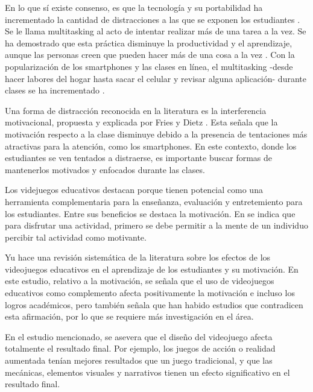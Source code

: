 En lo que sí existe consenso, es que la tecnología y su portabilidad ha incrementado la cantidad de distracciones a las que se exponen
los estudiantes \cite{Zimmerman2011HandbookOS, Wang2022ComprehensivelySummarizeDistractions}. Se le llama multitasking al acto de intentar realizar más de una tarea a la vez. Se ha demostrado que esta práctica disminuye la productividad y el aprendizaje, aunque las personas creen que pueden hacer más de una cosa a la vez \cite{Domoff2019AddictivePU}.  Con la popularización de los smartphones y las clases en línea, el multitasking -desde hacer labores del hogar hasta sacar el celular y revisar alguna aplicación- durante clases se ha incrementado \cite{Wang2022ComprehensivelySummarizeDistractions}.

Una forma de distracción reconocida en la literatura es la interferencia motivacional, propuesta y explicada por Fries y Dietz \cite{Fries2007LearningMotivationalInterference}. Esta señala que la motivación respecto a la clase disminuye debido a la presencia de tentaciones más atractivas para la atención, como los smartphones. En este contexto, donde los estudiantes se ven tentados a distraerse, es importante buscar formas de mantenerlos motivados y enfocados durante las clases.

Los videjuegos educativos destacan porque tienen potencial como una herramienta complementaria para la enseñanza, evaluación y entretemiento para los estudiantes. Entre sus beneficios se destaca la motivación. En \cite{Bisson1996FunInLEarningPedagogicalRole} se indica que para disfrutar una actividad, primero se debe permitir a la mente de un individuo percibir tal actividad como motivante. 

Yu \cite{Yu2020TheEffectsOfEducationGames} hace una revisión sistemática de la literatura sobre los efectos de los videojuegos educativos en el aprendizaje de los estudiantes y su motivación. En este estudio, relativo a la motivación, se señala que el uso de videojuegos educativos como complemento afecta positivamente la motivación e incluso los logros académicos, pero también señala que han habido estudios que contradicen esta afirmación, por lo que se requiere más investigación en el área.

En el estudio mencionado, se asevera que el diseño del videojuego afecta totalmente el resultado final. Por ejemplo, los juegos de acción o realidad aumentada tenían mejores resultados que un juego tradicional, y que las mecánicas, elementos visuales y narrativos tienen un efecto significativo en el resultado final.

